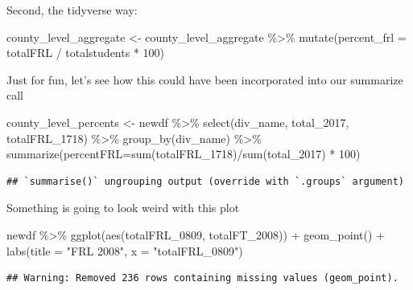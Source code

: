 \documentclass[
]{book}
\newenvironment{Shaded}{\begin{snugshade}}{\end{snugshade}}
\newcommand{\AttributeTok}[1]{\textcolor[rgb]{0.77,0.63,0.00}{#1}}
\newcommand{\DecValTok}[1]{\textcolor[rgb]{0.00,0.00,0.81}{#1}}
\newcommand{\FunctionTok}[1]{\textcolor[rgb]{0.00,0.00,0.00}{#1}}
\newcommand{\NormalTok}[1]{#1}
\newcommand{\OtherTok}[1]{\textcolor[rgb]{0.56,0.35,0.01}{#1}}
\newcommand{\SpecialCharTok}[1]{\textcolor[rgb]{0.00,0.00,0.00}{#1}}
\newcommand{\StringTok}[1]{\textcolor[rgb]{0.31,0.60,0.02}{#1}}
\begin{document}
Second, the tidyverse way:

\begin{Shaded}
\begin{Highlighting}[]
\NormalTok{county\_level\_aggregate }\OtherTok{\textless{}{-}}\NormalTok{ county\_level\_aggregate }\SpecialCharTok{\%\textgreater{}\%} 
  \FunctionTok{mutate}\NormalTok{(}\AttributeTok{percent\_frl =}\NormalTok{ totalFRL }\SpecialCharTok{/}\NormalTok{ totalstudents }\SpecialCharTok{*} \DecValTok{100}\NormalTok{)}
\end{Highlighting}
\end{Shaded}

Just for fun, let's see how this could have been incorporated into our summarize call

\begin{Shaded}
\begin{Highlighting}[]
\NormalTok{county\_level\_percents }\OtherTok{\textless{}{-}}\NormalTok{ newdf }\SpecialCharTok{\%\textgreater{}\%} 
  \FunctionTok{select}\NormalTok{(div\_name, total\_2017, totalFRL\_1718) }\SpecialCharTok{\%\textgreater{}\%}
  \FunctionTok{group\_by}\NormalTok{(div\_name) }\SpecialCharTok{\%\textgreater{}\%}
  \FunctionTok{summarize}\NormalTok{(}\AttributeTok{percentFRL=}\FunctionTok{sum}\NormalTok{(totalFRL\_1718)}\SpecialCharTok{/}\FunctionTok{sum}\NormalTok{(total\_2017) }\SpecialCharTok{*} \DecValTok{100}\NormalTok{)}
\end{Highlighting}
\end{Shaded}

\begin{verbatim}
## `summarise()` ungrouping output (override with `.groups` argument)
\end{verbatim}

Something is going to look weird with this plot

\begin{Shaded}
\begin{Highlighting}[]
\NormalTok{newdf }\SpecialCharTok{\%\textgreater{}\%} 
  \FunctionTok{ggplot}\NormalTok{(}\FunctionTok{aes}\NormalTok{(totalFRL\_0809, totalFT\_2008)) }\SpecialCharTok{+}
  \FunctionTok{geom\_point}\NormalTok{() }\SpecialCharTok{+}
  \FunctionTok{labs}\NormalTok{(}\AttributeTok{title =} \StringTok{"FRL 2008"}\NormalTok{, }\AttributeTok{x =} \StringTok{"totalFRL\_0809"}\NormalTok{)}
\end{Highlighting}
\end{Shaded}

\begin{verbatim}
## Warning: Removed 236 rows containing missing values (geom_point).
\end{verbatim}
\end{document}
